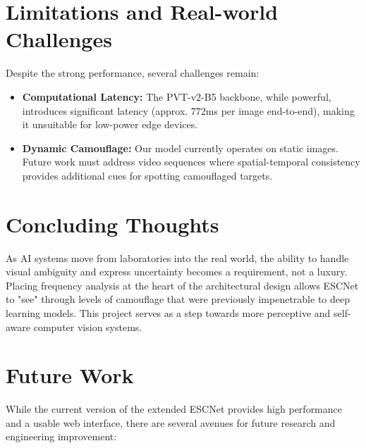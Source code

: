 \documentclass[12pt,a4paper]{report}
\begin{document}
\section{Limitations and Real-world Challenges}

Despite the strong performance, several challenges remain:
\begin{itemize}
    \item \textbf{Computational Latency:} The PVT-v2-B5 backbone, while powerful, introduces significant latency (approx. 772ms per image end-to-end), making it unsuitable for low-power edge devices.
    \item \textbf{Dynamic Camouflage:} Our model currently operates on static images. Future work must address video sequences where spatial-temporal consistency provides additional cues for spotting camouflaged targets.
\end{itemize}

\section{Concluding Thoughts}

As AI systems move from laboratories into the real world, the ability to handle visual ambiguity and express uncertainty becomes a requirement, not a luxury. Placing frequency analysis at the heart of the architectural design allows ESCNet to "see" through levels of camouflage that were previously impenetrable to deep learning models. This project serves as a step towards more perceptive and self-aware computer vision systems.

\section{Future Work}

While the current version of the extended ESCNet provides high performance and a usable web interface, there are several avenues for future research and engineering improvement:
\end{document}
